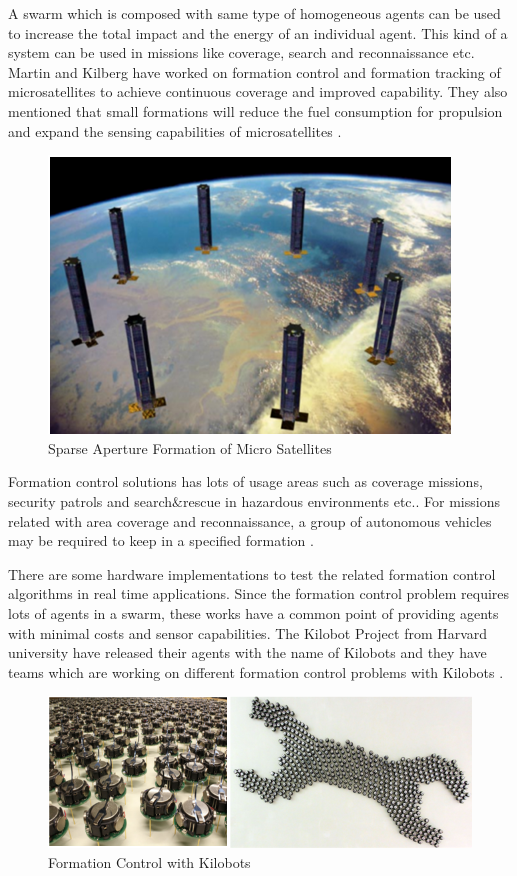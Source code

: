 A swarm which is composed with same type of homogeneous agents can be used to increase the total impact and the energy of an individual agent. This kind of a system can be used in missions like coverage, search and  reconnaissance etc.  Martin and Kilberg have worked on formation control and formation tracking of  microsatellites to achieve continuous coverage and improved capability. They also mentioned that small formations will reduce the fuel consumption for propulsion and expand the sensing capabilities of microsatellites \cite{15}.

\begin{figure}[H]
\caption{Sparse Aperture Formation of Micro Satellites \cite{15}}
\centering
\includegraphics[scale = 1]{Satellite}
\end{figure} 

Formation control solutions has lots of usage areas such as coverage missions, security patrols and search$\&$rescue in hazardous environments etc.\cite{13}. For missions related with area coverage and reconnaissance, a group of autonomous vehicles may be required to keep in a specified formation \cite{13}.  

There are some hardware implementations to test the related formation control algorithms in real time applications. Since the formation control problem requires lots of agents in a swarm, these works have a common point of providing agents with minimal costs and sensor capabilities. The Kilobot Project from Harvard university have released their agents with the name of Kilobots and they have teams which are working on different formation control problems with Kilobots \cite{98}.

\begin{figure}[H]
\caption{Formation Control with Kilobots \cite{98}}
\centering
\includegraphics[scale = 0.70]{kilobot}
\end{figure}

